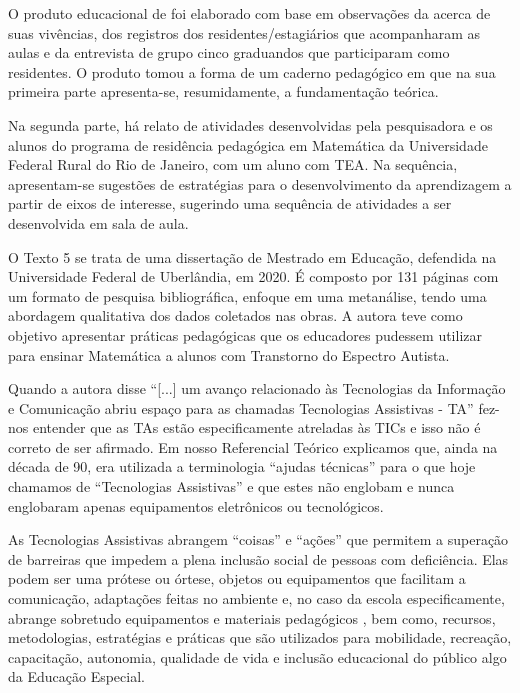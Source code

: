 \documentclass[portuguese]{textolivre}
\begin{document}
O produto educacional de \textcite{guimaraes2020} foi elaborado com base em
observações da acerca de suas vivências, dos registros dos
residentes/estagiários que acompanharam as aulas e da entrevista de
grupo cinco graduandos que participaram como residentes. O produto tomou
a forma de um caderno pedagógico em que na sua primeira parte
apresenta-se, resumidamente, a fundamentação teórica.

Na segunda parte, há relato de atividades desenvolvidas pela
pesquisadora e os alunos do programa de residência pedagógica em
Matemática da Universidade Federal Rural do Rio de Janeiro, com um aluno
com TEA. Na sequência, apresentam-se sugestões de estratégias para o
desenvolvimento da aprendizagem a partir de eixos de interesse,
sugerindo uma sequência de atividades a ser desenvolvida em sala de
aula.

O Texto 5 se trata de uma dissertação de Mestrado em Educação, defendida
na Universidade Federal de Uberlândia, em 2020. É composto por 131
páginas com um formato de pesquisa bibliográfica, enfoque em uma
metanálise, tendo uma abordagem qualitativa dos dados coletados nas
obras. A autora teve como objetivo apresentar práticas pedagógicas que
os educadores pudessem utilizar para ensinar Matemática a alunos com
Transtorno do Espectro Autista.

Quando a autora disse ``{[}...{]} um avanço relacionado às Tecnologias
da Informação e Comunicação abriu espaço para as chamadas Tecnologias
Assistivas - TA'' \cite[p.~100]{santos2020} fez-nos entender que as TAs
estão especificamente atreladas às TICs e isso não é correto de ser
afirmado. Em nosso Referencial Teórico explicamos que, ainda na década
de 90, era utilizada a terminologia ``ajudas técnicas'' para o que hoje
chamamos de ``Tecnologias Assistivas'' e que estes não englobam e nunca
englobaram apenas equipamentos eletrônicos ou tecnológicos.

As Tecnologias Assistivas abrangem ``coisas'' e ``ações'' que permitem a
superação de barreiras que impedem a plena inclusão social de pessoas
com deficiência. Elas podem ser uma prótese ou órtese, objetos ou
equipamentos que facilitam a comunicação, adaptações feitas no ambiente
e, no caso da escola especificamente, abrange sobretudo equipamentos e
materiais pedagógicos \cite{brasil1999}, bem como, recursos,
metodologias, estratégias e práticas \cite{brasil2007} que são
utilizados para mobilidade, recreação, capacitação, autonomia, qualidade
de vida e inclusão educacional do público algo da Educação Especial.
\end{document}
